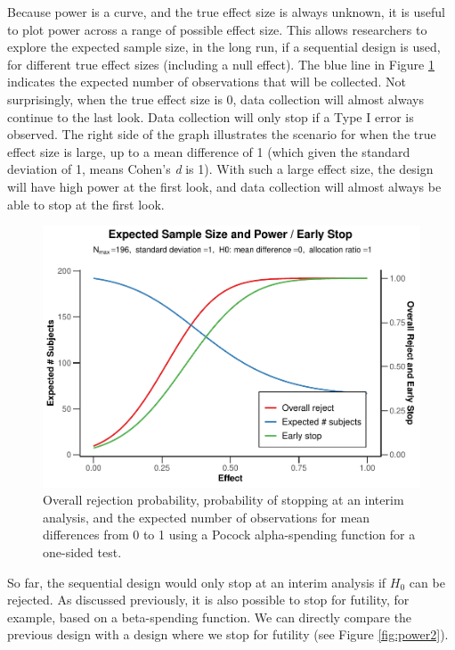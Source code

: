 \documentclass[
  english,
  ,man,floatsintext]{apa6}
\begin{document}
Because power is a curve, and the true effect size is always unknown, it is useful to plot power across a range of possible effect size. This allows researchers to explore the expected sample size, in the long run, if a sequential design is used, for different true effect sizes (including a null effect). The blue line in Figure \ref{fig:power1} indicates the expected number of observations that will be collected. Not surprisingly, when the true effect size is 0, data collection will almost always continue to the last look. Data collection will only stop if a Type I error is observed. The right side of the graph illustrates the scenario for when the true effect size is large, up to a mean difference of 1 (which given the standard deviation of 1, means Cohen's \emph{d} is 1). With such a large effect size, the design will have high power at the first look, and data collection will almost always be able to stop at the first look.

\begin{figure}
\centering
\includegraphics{sequential_tutorial_files/figure-latex/power1-1.pdf}
\caption{\label{fig:power1}Overall rejection probability, probability of stopping at an interim analysis, and the expected number of observations for mean differences from 0 to 1 using a Pocock alpha-spending function for a one-sided test.}
\end{figure}

So far, the sequential design would only stop at an interim analysis if \(H_0\) can be rejected. As discussed previously, it is also possible to stop for futility, for example, based on a beta-spending function. We can directly compare the previous design with a design where we stop for futility (see Figure \ref{fig:power2}).
\end{document}
